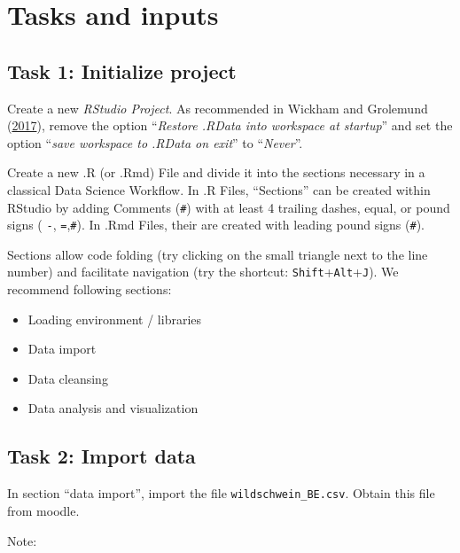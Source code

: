 \documentclass[]{book}
\providecommand{\tightlist}{%
  \setlength{\itemsep}{0pt}\setlength{\parskip}{0pt}}
\begin{document}
\hypertarget{tasks-and-inputs}{%
\section{Tasks and inputs}\label{tasks-and-inputs}}

\hypertarget{task-1-initialize-project}{%
\subsection{Task 1: Initialize project}\label{task-1-initialize-project}}

Create a new \emph{RStudio Project}. As recommended in Wickham and Grolemund (\protect\hyperlink{ref-wickham2017}{2017}), remove the option ``\emph{Restore .RData into workspace at startup}'' and set the option ``\emph{save workspace to .RData on exit}'' to ``\emph{Never}''.

Create a new .R (or .Rmd) File and divide it into the sections necessary in a classical Data Science Workflow. In .R Files, ``Sections'' can be created within RStudio by adding Comments (\texttt{\#}) with at least 4 trailing dashes, equal, or pound signs ( \texttt{-}, \texttt{=},\texttt{\#}). In .Rmd Files, their are created with leading pound signs (\texttt{\#}).

Sections allow code folding (try clicking on the small triangle next to the line number) and facilitate navigation (try the shortcut: \texttt{Shift}+\texttt{Alt}+\texttt{J}). We recommend following sections:

\begin{itemize}
\tightlist
\item
  Loading environment / libraries
\item
  Data import
\item
  Data cleansing
\item
  Data analysis and visualization
\end{itemize}

\hypertarget{task-2-import-data}{%
\subsection{Task 2: Import data}\label{task-2-import-data}}

In section ``data import'', import the file \texttt{wildschwein\_BE.csv}. Obtain this file from moodle.

Note:
\end{document}
